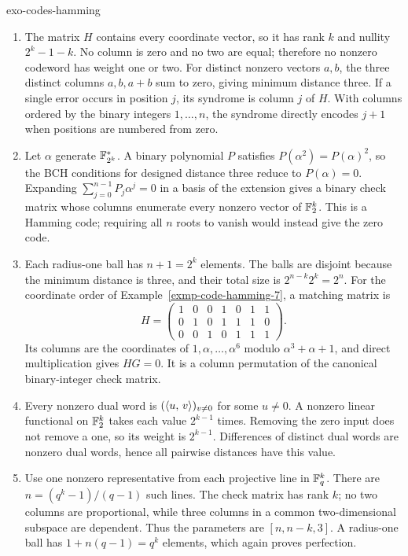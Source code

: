 \begin{correction}{exo-codes-hamming}
\begin{enumerate}
\item The matrix $H$ contains every coordinate vector, so it has rank
$k$ and nullity $2^k-1-k$. No column is zero and no two are equal;
therefore no nonzero codeword has weight one or two. For distinct nonzero
vectors $a,b$, the three distinct columns $a,b,a+b$ sum to zero, giving
minimum distance three. If a single error occurs in position $j$,
its syndrome is column $j$ of $H$. With columns ordered by the binary
integers $1,\ldots,n$, the syndrome directly encodes $j+1$ when positions
are numbered from zero.
\begin{listing}[H]

\caption{Syndrome decoding with columns ordered by binary integers.}
\label{listing-decodage-hamming}
\end{listing}
\begin{listing}[H]

\caption{Binary digits, least significant coordinate first.}
\label{binary-writing-listing}
\end{listing}
\item Let $\alpha$ generate $\mathbb{F}_{2^k}^*$. A binary polynomial $P$
satisfies $P(\alpha^2)=P(\alpha)^2$, so the BCH conditions for designed
distance three reduce to $P(\alpha)=0$. Expanding
$\sum_{j=0}^{n-1}P_j\alpha^j=0$ in a basis of the extension gives a
binary check matrix whose columns enumerate every nonzero vector of
$\mathbb{F}_2^k$. This is a Hamming code; requiring all $n$ roots to vanish
would instead give the zero code.
\item Each radius-one ball has $n+1=2^k$ elements. The balls are
disjoint because the minimum distance is three, and their total size
is $2^{n-k}2^k=2^n$. For the coordinate order of
Example~\ref{exmp-code-hamming-7}, a matching matrix is
\[
 H=\begin{pmatrix}1&0&0&1&0&1&1\\0&1&0&1&1&1&0\\0&0&1&0&1&1&1\end{pmatrix}.
\]
Its columns are the coordinates of $1,\alpha,\ldots,\alpha^6$ modulo
$\alpha^3+\alpha+1$, and direct multiplication gives $HG=0$.
It is a column permutation of the canonical binary-integer check matrix.
\item Every nonzero dual word is $(\langle u,\,v\rangle)_{v\ne0}$ for some
$u\ne0$. A nonzero linear functional on $\mathbb{F}_2^k$ takes each value
$2^{k-1}$ times. Removing the zero input does not remove a one, so its
weight is $2^{k-1}$. Differences of distinct dual words are nonzero
dual words, hence all pairwise distances have this value.
\item Use one nonzero representative from each projective line in
$\mathbb{F}_q^k$. There are $n=(q^k-1)/(q-1)$ such lines. The check matrix
has rank $k$; no two columns are proportional, while three columns in
a common two-dimensional subspace are dependent. Thus the parameters
are $[n,n-k,3]$. A radius-one ball has $1+n(q-1)=q^k$ elements,
which again proves perfection.
\end{enumerate}
\end{correction}

